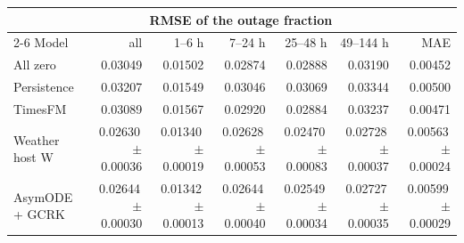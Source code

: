 \begin{tabular}{@{}lrrrrrr@{}}
\toprule
&\multicolumn{5}{c}{RMSE of the outage fraction}&\\
\cmidrule(lr){2-6}
Model&all&1--6 h&7--24 h&25--48 h&49--144 h&MAE\\
\midrule
All zero&0.03049&0.01502&0.02874&0.02888&0.03190&0.00452\\
Persistence&0.03207&0.01549&0.03046&0.03069&0.03344&0.00500\\
TimesFM&0.03089&0.01567&0.02920&0.02884&0.03237&0.00471\\
Weather host W&0.02630\,{\scriptsize$\pm$0.00036}&0.01340\,{\scriptsize$\pm$0.00019}&0.02628\,{\scriptsize$\pm$0.00053}&0.02470\,{\scriptsize$\pm$0.00083}&0.02728\,{\scriptsize$\pm$0.00037}&0.00563\,{\scriptsize$\pm$0.00024}\\
AsymODE + GCRK&0.02644\,{\scriptsize$\pm$0.00030}&0.01342\,{\scriptsize$\pm$0.00013}&0.02644\,{\scriptsize$\pm$0.00040}&0.02549\,{\scriptsize$\pm$0.00034}&0.02727\,{\scriptsize$\pm$0.00035}&0.00599\,{\scriptsize$\pm$0.00029}\\
\bottomrule
\end{tabular}
